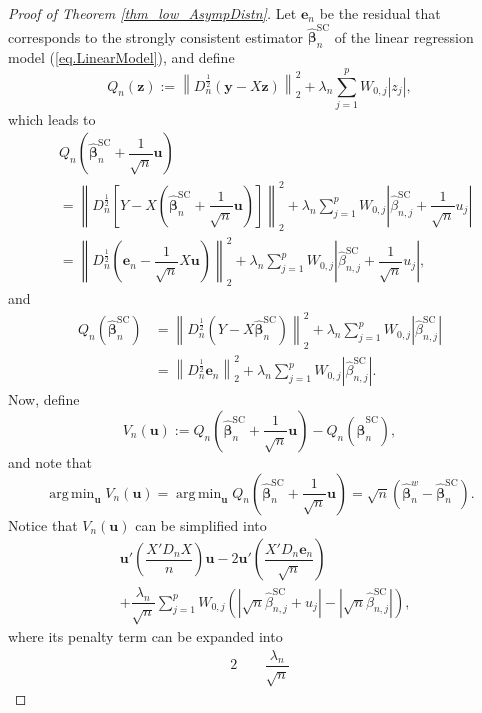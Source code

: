 \documentclass[ejs,authoryear,linksfromyear]{imsart}
\DeclareMathOperator*{\argmin}{arg\,min} %
\newcommand{\bnw}{\widehat{\bm{\beta}}_n^w} %
\newcommand{\bSC}{\widehat{\bm{\beta}}_n^{\text{SC}}} %
\numberwithin{equation}{section}
\theoremstyle{plain}
\begin{document}
\begin{proof}[Proof of Theorem \ref{thm_low_AsympDistn}]
	Let $\bm{e}_n$ be the residual that corresponds to the strongly consistent estimator $\bSC$ of the linear regression model (\ref{eq.LinearModel}), and define 
	$$
	Q_n (\bm{z}) := 
	\left\| 
	D_n^{\frac{1}{2}} (\bm{y} - X \bm{z})
	\right\|_2^2 
	+ \lambda_n \sum_{j=1}^p W_{0,j} |z_j|,
	$$
	which leads to 
	\begin{align*}
	&Q_n \left( \bSC + \dfrac{1}{\sqrt{n}} \bm{u} \right) \\
	&= \left\| 
	D_n^{\frac{1}{2}} 
	\left[
	Y - X \left( \bSC + \dfrac{1}{\sqrt{n}} \bm{u} \right)				
	\right]	
	\right\|_2^2
	+ \lambda_n 
	\sum_{j=1}^p W_{0,j} 
	\left|
		\widehat{\beta}^{\text{SC}}_{n,j} 
		+ \dfrac{1}{\sqrt{n} } u_j
	\right| \\
	&= \left\| 
	D_n^{\frac{1}{2}} 
	\left( 
	\bm{e}_n - \dfrac{1}{\sqrt{n}} X \bm{u}  
	\right)				
	\right\|_2^2
	+ \lambda_n 
	\sum_{j=1}^p W_{0,j} 
	\left|
		\widehat{\beta}^{\text{SC}}_{n,j} 
		+ \dfrac{1}{\sqrt{n} } u_j
	\right| , 
	\end{align*}
	and 
	\begin{align*}
	Q_n \left( \bSC  \right)
	&= \left\| 
	D_n^{\frac{1}{2}} 
	\left( 
	Y - X \bSC 
	\right)				
	\right\|_2^2
	+ \lambda_n 
	\sum_{j=1}^p W_{0,j} 
	\left|
		\widehat{\beta}^{\text{SC}}_{n,j} 
	\right|\\
	&= \left\| 
	D_n^{\frac{1}{2}} \bm{e}_n		
	\right\|_2^2
	+ \lambda_n
	\sum_{j=1}^p W_{0,j}  
	\left|
		\widehat{\beta}^{\text{SC}}_{n,j} 
	\right|.
	\end{align*}
	Now, define
	$$
	V_n( \bm{u} ) := 
	Q_n \left( \bSC  + \dfrac{1}{\sqrt{n}} \bm{u} \right) 
	- Q_n \left( \bSC  \right), 
	$$
	and note that
	$$
	\argmin_{ \bm{u} } V_n( \bm{u} )
	= \argmin_{ \bm{u} }  Q_n \left( \bSC  + \dfrac{1}{\sqrt{n}} \bm{u} \right)
	= \sqrt{n} \left( \bnw - \bSC \right).
	$$
	Notice that $V_n( \bm{u} )$ can be simplified into 
	\begin{align*}
	&\bm{u}' \left( \dfrac{X' D_n X}{n} \right) \bm{u} 
	-2 \bm{u}' \left( \dfrac{X' D_n \bm{e}_n}{\sqrt{n}} \right)\\
	&+ \dfrac{\lambda_n}{ \sqrt{n} } 
	\sum_{j=1}^p W_{0,j}
	\left(
		\left|
			\sqrt{n} \widehat{\beta}^{\text{SC}}_{n,j} + u_j
		\right|
		- \left|
			\sqrt{n} \widehat{\beta}^{\text{SC}}_{n,j}
		\right|
	\right),
	\end{align*}
	where its penalty term can be expanded into 
	\begin{alignat*}{2}
	&\quad \, \dfrac{\lambda_n}{ \sqrt{n} } 

\end{alignat*}
\end{proof}
\end{document}
